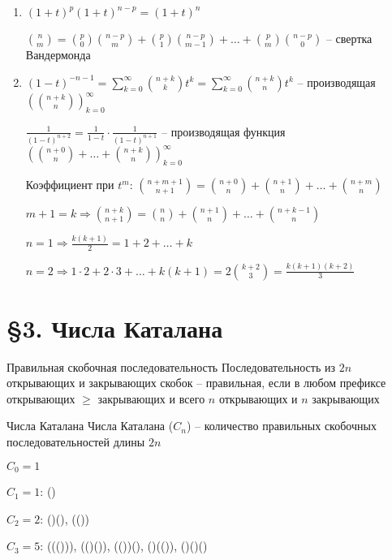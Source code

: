 \documentclass[12pt]{article}
\begin{document}
\begin{Example}{}
\begin{enumerate}
        \item $(1 + t)^p(1 + t)^{n - p} = ( 1 + t)^n$
        
        ${n \choose m} = {p \choose 0} {n - p \choose m} + {p \choose 1}{n - p \choose m - 1} + \ldots + {p \choose m}{n - p \choose 0}$ -- свертка Вандермонда

        \item $(1 - t)^{-n - 1} = \sum\limits_{k = 0}^\infty {n + k \choose k} t^k = \sum\limits_{k = 0}^\infty {n + k \choose n} t^k$ -- производящая $({n + k \choose n})_{k = 0}^\infty$
        
        $\frac{1}{(1 - t)^{n + 2}} = \frac{1}{1 - t} \cdot \frac{1}{(1 - t)^{n + 1}}$ -- производящая функция $({n + 0 \choose n} + \ldots + {n + k \choose n})_{k = 0}^\infty$

        Коэффициент при $t^m$: ${n + m + 1 \choose n + 1} = {n + 0 \choose n} + {n + 1 \choose n} + \ldots + {n + m \choose n}$

        $m + 1 = k \Rightarrow {n + k \choose n + 1} = {n \choose n} + {n + 1 \choose n} + \ldots + {n + k - 1 \choose n}$

        $n = 1 \Rightarrow \frac{k(k + 1)}{2} = 1 + 2 + \ldots + k$

        $n = 2 \Rightarrow 1 \cdot 2 + 2 \cdot 3 + \ldots + k(k + 1) = 2{ k + 2 \choose 3} = \frac{k(k + 1)(k + 2)}{3}$
    \end{enumerate}
\end{Example}

\newpage 

\section{\S 3. Числа Каталана}

\begin{defin}{Правильная скобочная последовательность}
    Последовательность из $2n$ открывающих и закрывающих скобок -- правильная, если в любом префиксе открывающих $\geq$ закрывающих и всего $n$ открывающих и $n$ закрывающих
\end{defin}

\begin{defin}{Числа Каталана}
    Числа Каталана ($C_n$) -- количество правильных скобочных последовательностей длины $2n$
\end{defin}

\begin{nota}{}
    $C_0 = 1$

    $C_1 = 1$: () 

    $C_2 = 2$: ()(), (())

    $C_3 = 5$: ((())), (()()), (())(), ()(()), ()()()
\end{nota}
\end{document}
